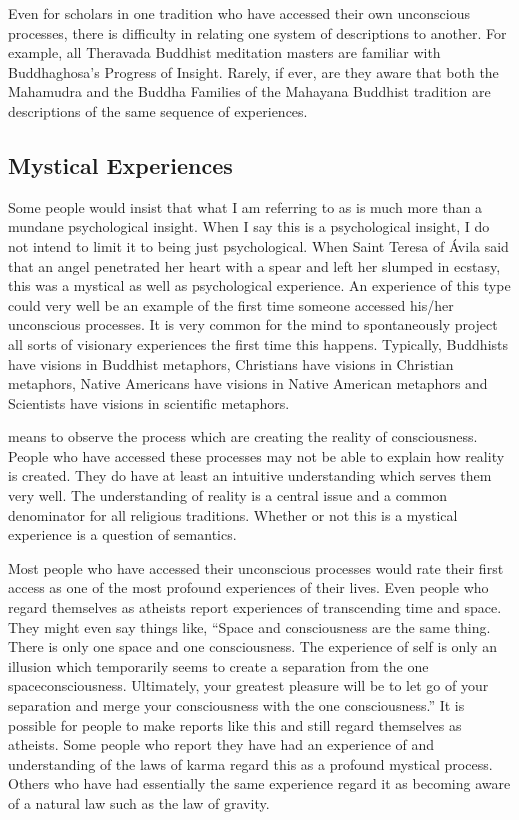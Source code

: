 \documentclass[a5paper,10pt,english]{book}
\begin{document}
\sphinxAtStartPar
Even for scholars in one tradition who have accessed their own
unconscious processes, there is difficulty in relating one system of
descriptions to another. For example, all Theravada Buddhist meditation
masters are familiar with Buddhaghosa’s Progress of Insight. Rarely, if
ever, are they aware that both the Mahamudra and the Buddha Families of
the Mahayana Buddhist tradition are descriptions of the same sequence of
experiences.


\subsection{Mystical Experiences}
\label{\detokenize{saints:mystical-experiences}}
\sphinxAtStartPar
Some people would insist that what I am referring to as  is much more than a mundane
psychological insight. When I say this is a psychological insight, I do
not intend to limit it to being just psychological. When Saint Teresa of
Ávila said that an angel penetrated her heart with a spear and left her
slumped in ecstasy, this was a mystical as well as psychological
experience. An experience of this type could very well be an example of
the first time someone accessed his/her unconscious processes. It is
very common for the mind to spontaneously project all sorts of visionary
experiences the first time this happens. Typically, Buddhists have
visions in Buddhist metaphors, Christians have visions in Christian
metaphors, Native Americans have visions in Native American metaphors
and Scientists have visions in scientific metaphors.

\sphinxAtStartPar
{} means to observe the
process which are creating the reality of consciousness. People who have
accessed these processes may not be able to explain how reality is
created. They do have at least an intuitive understanding which serves
them very well. The understanding of reality is a central issue and a
common denominator for all religious traditions. Whether or not this is
a mystical experience is a question of semantics.

\sphinxAtStartPar
Most people who have accessed their unconscious processes would rate
their first access as one of the most profound experiences of their
lives. Even people who regard themselves as atheists report experiences
of transcending time and space. They might even say things like, “Space
and consciousness are the same thing. There is only one space and one
consciousness. The experience of self is only an illusion which
temporarily seems to create a separation from the one
space\sphinxhyphen{}consciousness. Ultimately, your greatest pleasure will be to let
go of your separation and merge your consciousness with the one
consciousness.” It is possible for people to make reports like this and
still regard themselves as atheists. Some people who report they have
had an experience of and understanding of the laws of karma regard this
as a profound mystical process. Others who have had essentially the same
experience regard it as becoming aware of a natural law such as the law
of gravity.
\end{document}
